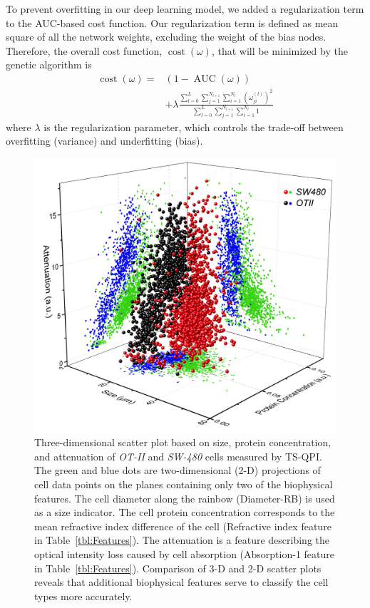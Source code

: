 \documentclass[aps,pra,reprint,superscriptaddress]{revtex4-1}
\DeclareMathOperator{\AUC}{AUC} %
\DeclareMathOperator{\cost}{cost} %
\begin{document}
To prevent overfitting in our deep learning model, we added a regularization term to the AUC-based cost function. Our regularization term is defined as mean square of all the network weights, excluding the weight of the bias nodes. Therefore, the overall cost function, $\cost(\omega)$, that will be minimized by the genetic algorithm is
\begin{equation}
\begin{split}
\cost(\omega) = & (1 - \AUC(\omega)) \\
& + \lambda \frac{\sum_{l=0}^{L} \sum_{j=1}^{N_{l+1}} \sum_{i=1}^{N_l} (\omega_{ji}^{(l)})^2}{\sum_{l=0}^{L} \sum_{j=1}^{N_{l+1}} \sum_{i=1}^{N_l} 1}
\end{split}
\end{equation}
where $\lambda$ is the regularization parameter, which controls the trade-off between overfitting (variance) and underfitting (bias).

\begin{figure}
\includegraphics[scale=0.2]{FigureOTSWScatter.jpg}
\caption{\label{fig:OTSWScatter} Three-dimensional scatter plot based on size, protein concentration, and attenuation of \textit{OT-II} and \textit{SW-480} cells measured by TS-QPI. The green and blue dots are two-dimensional (2-D) projections of cell data points on the planes containing only two of the biophysical features. The cell diameter along the rainbow (Diameter-RB) is used as a size indicator. The cell protein concentration corresponds to the mean refractive index difference of the cell (Refractive index feature in Table~\ref{tbl:Features}). The attenuation is a feature describing the optical intensity loss caused by cell absorption (Absorption-1 feature in Table~\ref{tbl:Features}). Comparison of 3-D and 2-D scatter plots reveals that additional biophysical features serve to classify the cell types more accurately.}
\end{figure}
\end{document}
